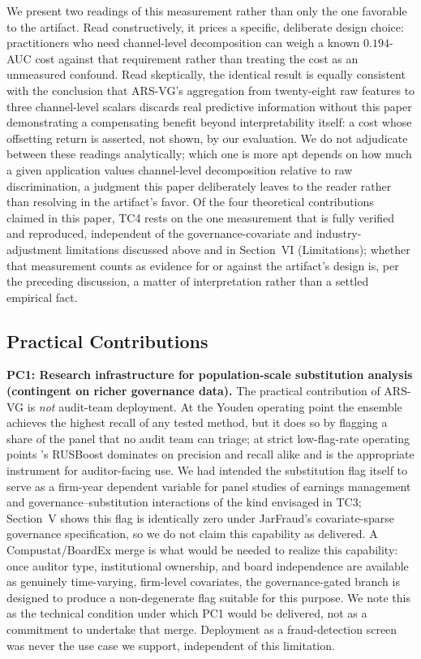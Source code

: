 \documentclass[12pt]{article}
\begin{document}
We present two readings of this measurement rather than only the one
favorable to the artifact.  Read constructively, it prices a specific,
deliberate design choice: practitioners who need channel-level
decomposition can weigh a known $0.194$-AUC cost against that
requirement rather than treating the cost as an unmeasured confound.
Read skeptically, the identical result is equally consistent with the
conclusion that ARS-VG's aggregation from twenty-eight raw features to
three channel-level scalars discards real predictive information
without this paper demonstrating a compensating benefit beyond
interpretability itself: a cost whose offsetting return is asserted,
not shown, by our evaluation.  We do not adjudicate between these
readings analytically; which one is more apt depends on how much a
given application values channel-level decomposition relative to raw
discrimination, a judgment this paper deliberately leaves to the
reader rather than resolving in the artifact's favor.  Of
the four theoretical contributions claimed in this paper, TC4 rests on
the one measurement that is fully verified and reproduced, independent
of the governance-covariate and industry-adjustment limitations
discussed above and in Section~VI (Limitations); whether that
measurement counts as evidence for or against the artifact's design is,
per the preceding discussion, a matter of interpretation rather than a
settled empirical fact.

\subsection*{Practical Contributions}

\textbf{PC1: Research infrastructure for population-scale
substitution analysis (contingent on richer governance data).}  The
practical contribution of ARS-VG is \emph{not} audit-team deployment.
At the Youden operating point the ensemble achieves the highest recall
of any tested method, but it does so by flagging a share of the panel
that no audit team can triage; at strict low-flag-rate operating points
\citet{bao2020}'s RUSBoost dominates on precision and recall alike and
is the appropriate instrument for auditor-facing use.  We had intended
the substitution flag itself to serve as a firm-year dependent variable
for panel studies of earnings management and governance--substitution
interactions of the kind envisaged in TC3; Section~V shows this flag is
identically zero under JarFraud's covariate-sparse governance
specification, so we do not claim this capability as delivered.  A
Compustat/BoardEx merge is what would be needed to realize this
capability: once
auditor type, institutional ownership, and board independence are
available as genuinely time-varying, firm-level covariates, the
governance-gated branch is designed to produce a non-degenerate flag
suitable for this purpose.  We note this as the technical condition
under which PC1 would be delivered, not as a commitment to undertake
that merge.  Deployment as a fraud-detection screen was
never the use case we support, independent of this limitation.
\end{document}
